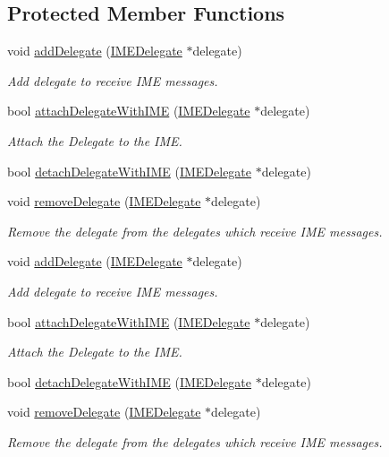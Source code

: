 \subsection*{Protected Member Functions}
\begin{DoxyCompactItemize}
\item 
void \hyperlink{classIMEDispatcher_a991abebe2e5ad9c8bb3dfee9b6b49157}{add\+Delegate} (\hyperlink{classIMEDelegate}{I\+M\+E\+Delegate} $\ast$delegate)
\begin{DoxyCompactList}\small\item\em Add delegate to receive I\+ME messages. \end{DoxyCompactList}\item 
bool \hyperlink{classIMEDispatcher_a5d08b8699ff78fb42b065b4030f8ea11}{attach\+Delegate\+With\+I\+ME} (\hyperlink{classIMEDelegate}{I\+M\+E\+Delegate} $\ast$delegate)
\begin{DoxyCompactList}\small\item\em Attach the Delegate to the I\+ME. \end{DoxyCompactList}\item 
bool \hyperlink{classIMEDispatcher_a091237af7143044d6d06638db88cfdde}{detach\+Delegate\+With\+I\+ME} (\hyperlink{classIMEDelegate}{I\+M\+E\+Delegate} $\ast$delegate)
\item 
void \hyperlink{classIMEDispatcher_ac0d379594be4a0e0e7821b60b9ca28a1}{remove\+Delegate} (\hyperlink{classIMEDelegate}{I\+M\+E\+Delegate} $\ast$delegate)
\begin{DoxyCompactList}\small\item\em Remove the delegate from the delegates which receive I\+ME messages. \end{DoxyCompactList}\item 
void \hyperlink{classIMEDispatcher_a991abebe2e5ad9c8bb3dfee9b6b49157}{add\+Delegate} (\hyperlink{classIMEDelegate}{I\+M\+E\+Delegate} $\ast$delegate)
\begin{DoxyCompactList}\small\item\em Add delegate to receive I\+ME messages. \end{DoxyCompactList}\item 
bool \hyperlink{classIMEDispatcher_a5d08b8699ff78fb42b065b4030f8ea11}{attach\+Delegate\+With\+I\+ME} (\hyperlink{classIMEDelegate}{I\+M\+E\+Delegate} $\ast$delegate)
\begin{DoxyCompactList}\small\item\em Attach the Delegate to the I\+ME. \end{DoxyCompactList}\item 
bool \hyperlink{classIMEDispatcher_a091237af7143044d6d06638db88cfdde}{detach\+Delegate\+With\+I\+ME} (\hyperlink{classIMEDelegate}{I\+M\+E\+Delegate} $\ast$delegate)
\item 
void \hyperlink{classIMEDispatcher_ac0d379594be4a0e0e7821b60b9ca28a1}{remove\+Delegate} (\hyperlink{classIMEDelegate}{I\+M\+E\+Delegate} $\ast$delegate)
\begin{DoxyCompactList}\small\item\em Remove the delegate from the delegates which receive I\+ME messages. \end{DoxyCompactList}\end{DoxyCompactItemize}
